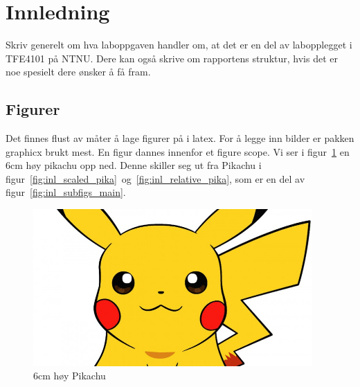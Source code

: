 \section{Innledning}

Skriv generelt om hva laboppgaven handler om, at det er en del av labopplegget i TFE4101 på NTNU. 
Dere kan også skrive om rapportens struktur, hvis det er noe spesielt dere ønsker å få fram.

\subsection{Figurer}

Det finnes flust av måter å lage figurer på i latex. For å legge inn bilder er pakken graphicx brukt mest. En figur dannes innenfor et figure scope. 
Vi ser i figur~\ref{fig:inl_6cm_pika} en 6cm høy pikachu opp ned. Denne skiller seg ut fra Pikachu i figur~\ref{fig:inl_scaled_pika}~og~\ref{fig:inl_relative_pika}, som er en del av figur~\ref{fig:inl_subfigs_main}.



\begin{figure}[!htb]
    \centering
    
    \includegraphics[height=6cm, angle=180]{figurer/pika.jpg}
    \caption{6cm høy Pikachu}
    \label{fig:inl_6cm_pika}
\end{figure}

